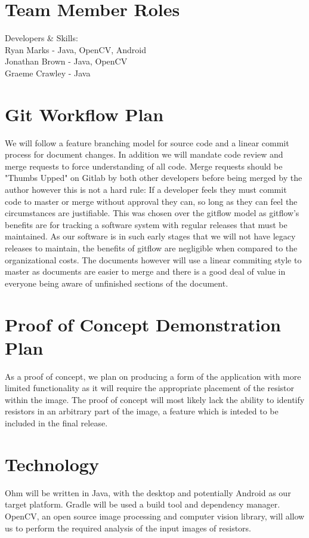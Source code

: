 \documentclass{article}
\begin{document}
\section{Team Member Roles}

Developers \& Skills: \\
Ryan Marks - Java, OpenCV, Android \\
Jonathan Brown - Java, OpenCV \\
Graeme Crawley - Java \\

\section{Git Workflow Plan}

We will follow a feature branching model for source code and a linear commit process for document changes.
In addition we will mandate code review and merge requests to force understanding of all code.
Merge requests should be "Thumbs Upped" on Gitlab by both other developers before being merged by the author however this is not a hard rule:
If a developer feels they must commit code to master or merge without approval they can, so long as they can feel the circumstances are justifiable.
This was chosen over the gitflow model as gitflow's benefits are for tracking a software system with regular releases that must be maintained.
As our software is in such early stages that we will not have legacy releases to maintain, the benefits of gitflow are negligible when compared to the organizational costs.
The documents however will use a linear commiting style to master as documents are easier to merge and there is a good deal of value in everyone being aware of unfinished sections of the document.

\section{Proof of Concept Demonstration Plan}
As a proof of concept, we plan on producing a form of the application with more limited functionality as it will require the appropriate placement of the resistor within the image. The proof of concept will most likely lack the ability to identify resistors in an arbitrary part of the image, a feature which is inteded to be included in the final release.

\section{Technology}
Ohm will be written in Java, with the desktop and potentially Android as our target platform. Gradle will be used a build tool and dependency manager. OpenCV, an open source image processing and computer vision library, will allow us to perform the required analysis of the input images of resistors.
\end{document}
